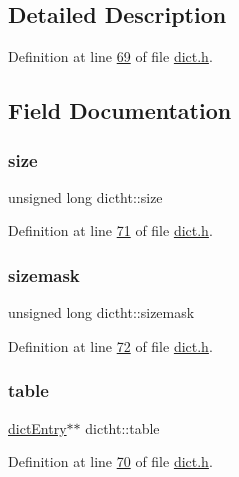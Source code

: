 \subsection{Detailed Description}


Definition at line \hyperlink{dict_8h_source_l00069}{69} of file \hyperlink{dict_8h_source}{dict.\+h}.



\subsection{Field Documentation}
\mbox{\label{structdictht_ac8ef79c0bdbbddfc028e1c16794cd261}} 
\subsubsection{\texorpdfstring{size}{size}}
{\footnotesize\ttfamily unsigned long dictht\+::size}



Definition at line \hyperlink{dict_8h_source_l00071}{71} of file \hyperlink{dict_8h_source}{dict.\+h}.

\mbox{\label{structdictht_a72530b5a4f8cba9e264242004c273653}} 
\subsubsection{\texorpdfstring{sizemask}{sizemask}}
{\footnotesize\ttfamily unsigned long dictht\+::sizemask}



Definition at line \hyperlink{dict_8h_source_l00072}{72} of file \hyperlink{dict_8h_source}{dict.\+h}.

\mbox{\label{structdictht_af723bb6ba2e520eab1c53500e2e5c835}} 
\subsubsection{\texorpdfstring{table}{table}}
{\footnotesize\ttfamily \hyperlink{structdictEntry}{dict\+Entry}$\ast$$\ast$ dictht\+::table}



Definition at line \hyperlink{dict_8h_source_l00070}{70} of file \hyperlink{dict_8h_source}{dict.\+h}.

